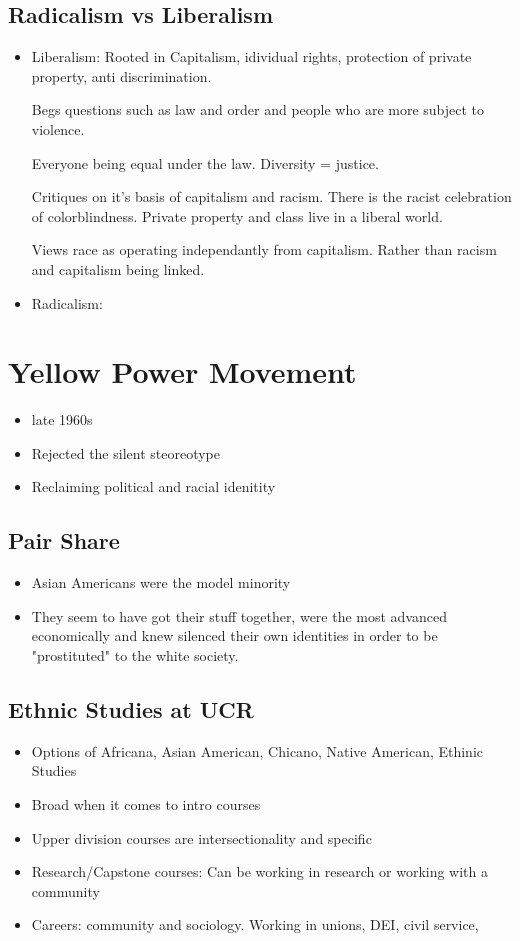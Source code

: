 \documentclass{article}
\begin{document}
\subsection{Radicalism vs Liberalism}
\begin{itemize}
  \item Liberalism:
    Rooted in Capitalism,
    idividual rights,
    protection of private property,
    anti discrimination.

    Begs questions such as law and order and people
    who are more subject to violence.

    Everyone being equal under the law.
    Diversity = justice. 

    Critiques on it's basis of capitalism and racism.
    There is the racist celebration of colorblindness.
    Private property and class live in a liberal world.

    Views race as operating independantly from capitalism.
    Rather than racism and capitalism being linked.

  \item Radicalism:
\end{itemize}

\pagebreak
\section{Yellow Power Movement}
\begin{itemize}
  \item late 1960s
  \item Rejected the silent steoreotype 
  \item Reclaiming political and racial idenitity
\end{itemize}

\subsection{Pair Share}
\begin{itemize}
  \item Asian Americans were the model minority
  \item They seem to have got their stuff together,
    were the most advanced economically and knew silenced
    their own identities in order to be "prostituted" to the white society.
\end{itemize}
\subsection{Ethnic Studies at UCR}
\begin{itemize}
  \item Options of Africana, Asian American, Chicano, Native American, Ethinic Studies
  \item Broad when it comes to intro courses
  \item Upper division courses are intersectionality and specific
  \item Research/Capstone courses:
    Can be working in research or working with a community
  \item Careers:
    community and sociology. Working in unions, DEI, civil service,
\end{itemize}
\end{document}
